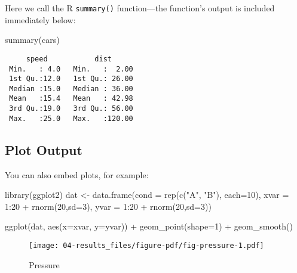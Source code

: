 \documentclass[
  a4paper,
]{article}
\newenvironment{Shaded}{\begin{snugshade}}{\end{snugshade}}
\newcommand{\AttributeTok}[1]{\textcolor[rgb]{0.40,0.45,0.13}{#1}}
\newcommand{\DecValTok}[1]{\textcolor[rgb]{0.68,0.00,0.00}{#1}}
\newcommand{\FunctionTok}[1]{\textcolor[rgb]{0.28,0.35,0.67}{#1}}
\newcommand{\NormalTok}[1]{\textcolor[rgb]{0.00,0.23,0.31}{#1}}
\newcommand{\OtherTok}[1]{\textcolor[rgb]{0.00,0.23,0.31}{#1}}
\newcommand{\SpecialCharTok}[1]{\textcolor[rgb]{0.37,0.37,0.37}{#1}}
\newcommand{\StringTok}[1]{\textcolor[rgb]{0.13,0.47,0.30}{#1}}
\begin{document}
Here we call the R \texttt{summary()} function---the function's output
is included immediately below:

\begin{Shaded}
\begin{Highlighting}[]
\FunctionTok{summary}\NormalTok{(cars)}
\end{Highlighting}
\end{Shaded}

\begin{verbatim}
     speed           dist       
 Min.   : 4.0   Min.   :  2.00  
 1st Qu.:12.0   1st Qu.: 26.00  
 Median :15.0   Median : 36.00  
 Mean   :15.4   Mean   : 42.98  
 3rd Qu.:19.0   3rd Qu.: 56.00  
 Max.   :25.0   Max.   :120.00  
\end{verbatim}

\subsection{Plot Output}\label{plot-output}

You can also embed plots, for example:

\begin{Shaded}
\begin{Highlighting}[]
\FunctionTok{library}\NormalTok{(ggplot2)}
\NormalTok{dat }\OtherTok{\textless{}{-}} \FunctionTok{data.frame}\NormalTok{(}\AttributeTok{cond =} \FunctionTok{rep}\NormalTok{(}\FunctionTok{c}\NormalTok{(}\StringTok{"A"}\NormalTok{, }\StringTok{"B"}\NormalTok{), }\AttributeTok{each=}\DecValTok{10}\NormalTok{),}
                  \AttributeTok{xvar =} \DecValTok{1}\SpecialCharTok{:}\DecValTok{20} \SpecialCharTok{+} \FunctionTok{rnorm}\NormalTok{(}\DecValTok{20}\NormalTok{,}\AttributeTok{sd=}\DecValTok{3}\NormalTok{),}
                  \AttributeTok{yvar =} \DecValTok{1}\SpecialCharTok{:}\DecValTok{20} \SpecialCharTok{+} \FunctionTok{rnorm}\NormalTok{(}\DecValTok{20}\NormalTok{,}\AttributeTok{sd=}\DecValTok{3}\NormalTok{))}

\FunctionTok{ggplot}\NormalTok{(dat, }\FunctionTok{aes}\NormalTok{(}\AttributeTok{x=}\NormalTok{xvar, }\AttributeTok{y=}\NormalTok{yvar)) }\SpecialCharTok{+}
    \FunctionTok{geom\_point}\NormalTok{(}\AttributeTok{shape=}\DecValTok{1}\NormalTok{) }\SpecialCharTok{+} 
    \FunctionTok{geom\_smooth}\NormalTok{() }
\end{Highlighting}
\end{Shaded}

\begin{figure}[H]

\texttt{[image: 04-results\_files/figure-pdf/fig-pressure-1.pdf]}

\caption{\label{fig-pressure}Pressure}

\end{figure}%
\end{document}
